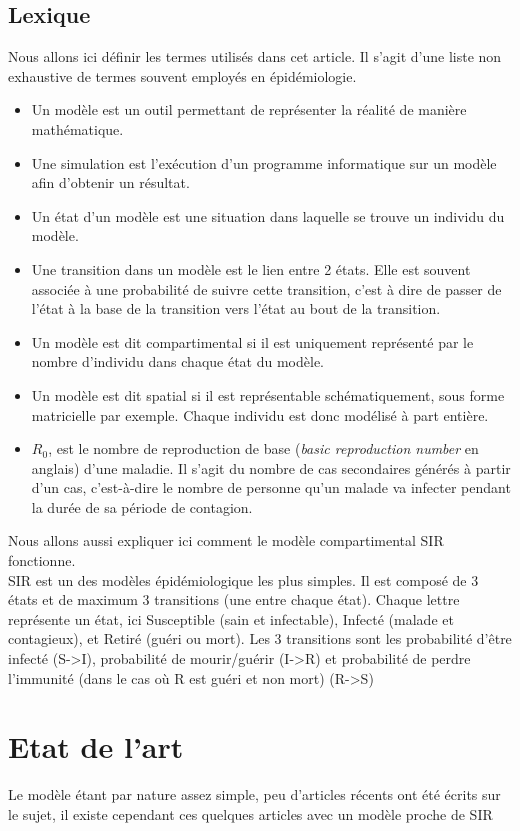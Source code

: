 \documentclass[journal, a4paper]{IEEEtran}
\begin{document}
	\subsection{Lexique}
	Nous allons ici définir les termes utilisés dans cet article. Il s'agit d'une liste non exhaustive de termes souvent employés en épidémiologie.
	\begin{itemize}
		\item Un modèle est un outil permettant de représenter la réalité de manière mathématique.
		\item Une simulation est l'exécution d'un programme informatique sur un modèle afin d'obtenir un résultat.
		\item Un état d'un modèle est une situation dans laquelle se trouve un individu du modèle.
		\item Une transition dans un modèle est le lien entre 2 états. Elle est souvent associée à une probabilité de suivre cette transition, c'est à dire de passer de l'état à la base de la transition vers l'état au bout de la transition.
		\item Un modèle est dit compartimental si il est uniquement représenté par le nombre d'individu dans chaque état du modèle.
		\item Un modèle est dit spatial si il est représentable schématiquement, sous forme matricielle par exemple. Chaque individu est donc modélisé à part entière.
		\item $R_0$, est le nombre de reproduction de base (\emph{basic reproduction number} en anglais) d'une maladie. Il s'agit du nombre de cas secondaires générés à partir d'un cas, c'est-à-dire le nombre de personne qu'un malade va infecter pendant la durée de sa période de contagion.
	\end{itemize}
	Nous allons aussi expliquer ici comment le modèle compartimental SIR fonctionne. \\
	SIR est un des modèles épidémiologique les plus simples. Il est composé de 3 états et de maximum 3 transitions (une entre chaque état). Chaque lettre représente un état, ici Susceptible (sain et infectable), Infecté (malade et contagieux), et Retiré (guéri ou mort). Les 3 transitions sont les probabilité d'être infecté (S->I), probabilité de mourir/guérir (I->R) et probabilité de perdre l'immunité (dans le cas où R est guéri et non mort) (R->S)

\section{Etat de l'art}
	Le modèle étant par nature assez simple, peu d'articles récents ont été écrits sur le sujet, il existe cependant ces quelques articles avec un modèle proche de SIR
\end{document}
